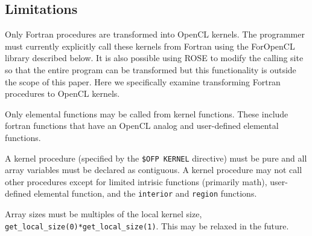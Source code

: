 \subsection{Limitations}

Only Fortran procedures are transformed into OpenCL kernels.  The programmer
must currently explicitly call these kernels from Fortran using the ForOpenCL
library described below.  It is also possible using ROSE to modify the calling
site so that the entire program can be transformed but this functionality is
outside the scope of this paper.  Here we specifically examine transforming
Fortran procedures to OpenCL kernels.

Only elemental functions may be called from kernel functions.  These include
fortran functions that have an OpenCL analog and user-defined elemental functions.

A kernel procedure (specified by the {\tt \!\$OFP KERNEL} directive) must be
pure and all array variables must be declared as contiguous.  A kernel
procedure may not call other procedures except for limited intrisic
functions (primarily math), user-defined elemental function, and the
{\tt interior} and {\tt region} functions.

Array sizes must be multiples of the local kernel size, {\tt
  get\_local\_size(0)*get\_local\_size(1)}.  This may be relaxed in
the future.
